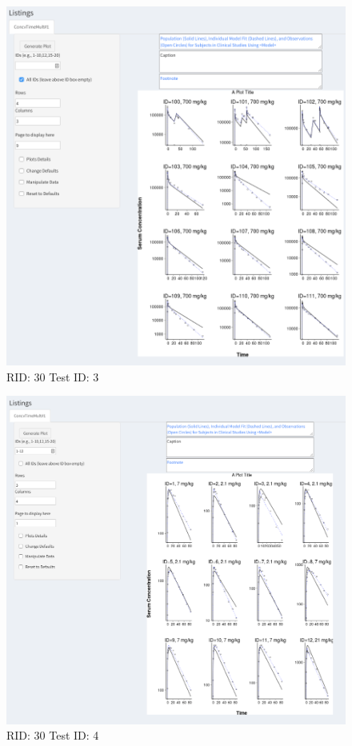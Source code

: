 \begin{figure}[H]
\includegraphics[width=.8\textwidth]{screencaps/30-3-2.png}
\caption{RID: 30 Test ID: 3}
\end{figure}
\begin{figure}[H]
\includegraphics[width=.8\textwidth]{screencaps/30-4-1.png}
\caption{RID: 30 Test ID: 4}
\end{figure}
